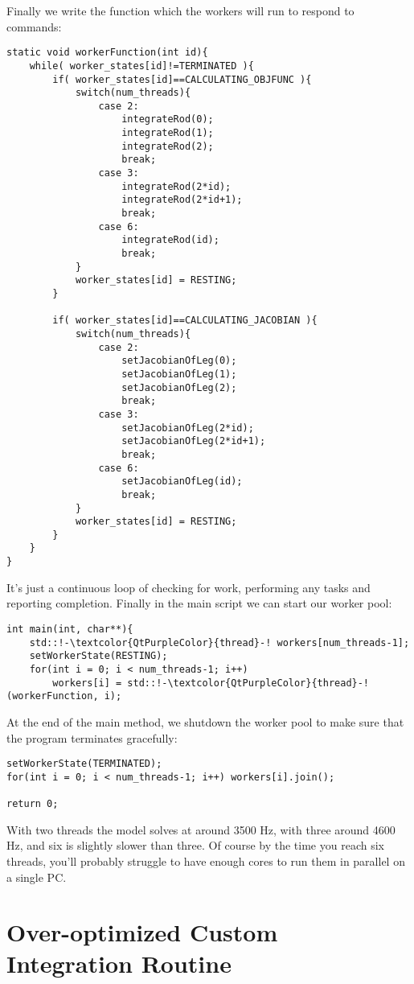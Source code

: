 \documentclass[12pt]{article}
\begin{document}
Finally we write the function which the workers will run to respond to commands:
\begin{lstlisting}
static void workerFunction(int id){
    while( worker_states[id]!=TERMINATED ){
        if( worker_states[id]==CALCULATING_OBJFUNC ){
            switch(num_threads){
                case 2:
                    integrateRod(0);
                    integrateRod(1);
                    integrateRod(2);
                    break;
                case 3:
                    integrateRod(2*id);
                    integrateRod(2*id+1);
                    break;
                case 6:
                    integrateRod(id);
                    break;
            }
            worker_states[id] = RESTING;
        }

        if( worker_states[id]==CALCULATING_JACOBIAN ){
            switch(num_threads){
                case 2:
                    setJacobianOfLeg(0);
                    setJacobianOfLeg(1);
                    setJacobianOfLeg(2);
                    break;
                case 3:
                    setJacobianOfLeg(2*id);
                    setJacobianOfLeg(2*id+1);
                    break;
                case 6:
                    setJacobianOfLeg(id);
                    break;
            }
            worker_states[id] = RESTING;
        }
    }
}
\end{lstlisting}
It's just a continuous loop of checking for work, performing any tasks and reporting completion. Finally in the main script we can start our worker pool:
\begin{lstlisting}
int main(int, char**){
    std::!-\textcolor{QtPurpleColor}{thread}-! workers[num_threads-1];
    setWorkerState(RESTING);
    for(int i = 0; i < num_threads-1; i++)
        workers[i] = std::!-\textcolor{QtPurpleColor}{thread}-!(workerFunction, i);
\end{lstlisting}
At the end of the main method, we shutdown the worker pool to make sure that the program terminates gracefully:
\begin{lstlisting}
setWorkerState(TERMINATED);
for(int i = 0; i < num_threads-1; i++) workers[i].join();

return 0;
\end{lstlisting}
With two threads the model solves at around 3500 Hz, with three around 4600 Hz, and six is slightly slower than three. Of course by the time you reach six threads, you'll probably struggle to have enough cores to run them in parallel on a single PC.

\section{Over-optimized Custom Integration Routine}
\end{document}
